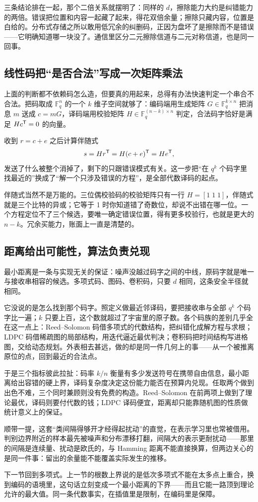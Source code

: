 三条结论排在一起，那个二倍关系就摆明了：同样的 \(d\)，擦除能力大约是纠错能力的两倍。错误把位置和内容一起藏了起来，得花双倍余量；擦除只藏内容，位置是白给的。分布式存储之所以敢用低冗余的纠删码，正因为盘坏了是擦除而不是错误——它明确知道哪一块没了。通信里区分二元擦除信道与二元对称信道，也是同一回事。

\subsection{线性码把``是否合法''写成一次矩阵乘法}

上面的判断都不依赖码怎么造，但要真的用起来，总得有办法快速判定一个串合不合法。把码取成 \(\mathbb F_q^n\) 的一个 \(k\) 维子空间就够了：编码端用生成矩阵 \(G\in\mathbb F_q^{k\times n}\) 把消息 \(m\) 送成 \(c=mG\)，译码端用校验矩阵 \(H\in\mathbb F_q^{(n-k)\times n}\) 判定，合法码字恰好是满足 \(Hc^{\mathsf{T}}=0\) 的向量。

收到 \(r=c+e\) 之后计算伴随式
\[
s=Hr^{\mathsf{T}}=H(c+e)^{\mathsf{T}}=He^{\mathsf{T}},
\]
发送了什么被整个消掉了，剩下的只跟错误模式有关。这一步把``在 \(q^k\) 个码字里找最近的''换成了``解一个只涉及错误的方程''，是全部代数译码的起点。

伴随式当然不是万能的。三位偶校验码的校验矩阵只有一行 \(H=[1\;1\;1]\)，伴随式就是三个比特的异或；它等于 1 时你知道错了奇数位，却说不出错在哪一位。一个方程定位不了三个候选，要唯一确定错误位置，得有更多校验行，也就是更大的 \(n-k\)。冗余买能力，账面上一直是清楚的。

\subsection{距离给出可能性，算法负责兑现}

最小距离是一条与实现无关的保证：噪声没越过码字之间的中线，原码字就是唯一与接收串相容的候选。多项式码、图码、卷积码，只要 \(d\) 相同，这条安全半径就相同。

它没说的是怎么找到那个码字。照定义做最近邻译码，要把接收串与全部 \(q^k\) 个码字比一遍；\(k\) 只要上百，这个数就超过了宇宙里的原子数。各个码族的差别几乎全在这一点上：Reed--Solomon 码借多项式的代数结构，把纠错化成解方程与求根；LDPC 码借稀疏图的局部结构，用迭代逼近最优判决；卷积码把时间结构写进格图，交给动态规划。外表相去甚远，做的却是同一件几何上的事——从一个被推离原位的点，回到最近的合法点。

于是三个指标彼此拉扯：码率 \(k/n\) 衡量有多少发送符号在携带自由信息，最小距离给出容错的硬上界，译码复杂度决定这份能力能否在预算内兑现。任取两个做到出色不难，三个同时兼顾则没有免费的构造。Reed--Solomon 在前两项上做到了理论最优，译码则要付代数的钱；LDPC 译码便宜，距离却只能靠随机图的性质做统计意义上的保证。

顺带一提，这套``类间隔得够开才经得起扰动''的直觉，在表示学习里也常被借用。判别边界附近的样本最先被噪声和分布漂移打翻，间隔大的表示更耐扰动——那里的间隔是连续量、扰动是欧氏的，与 Hamming 距离不能直接换算，但两边关心的是同一件事：留出的余量能不能覆盖实际发生的推移。

下一节回到多项式。上一节的根数上界说的是低次多项式不能在太多点上重合，换到编码的语境里，这句话立刻变成一个最小距离的下界——而且它能一路顶到理论允许的最大值。同一条代数事实，在插值里是限制，在编码里是保障。
